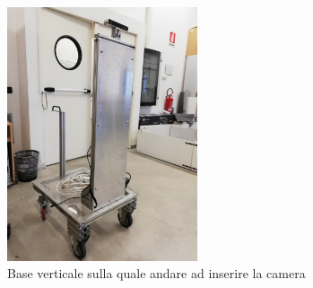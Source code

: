\begin{figure}
	\centering
	\includegraphics[width=0.5\textwidth]{Immagini/SupportoCamera.jpg}
	\caption{Base verticale sulla quale andare ad inserire la camera}
	\label{fig:SupportoRialzato}
\end{figure}

